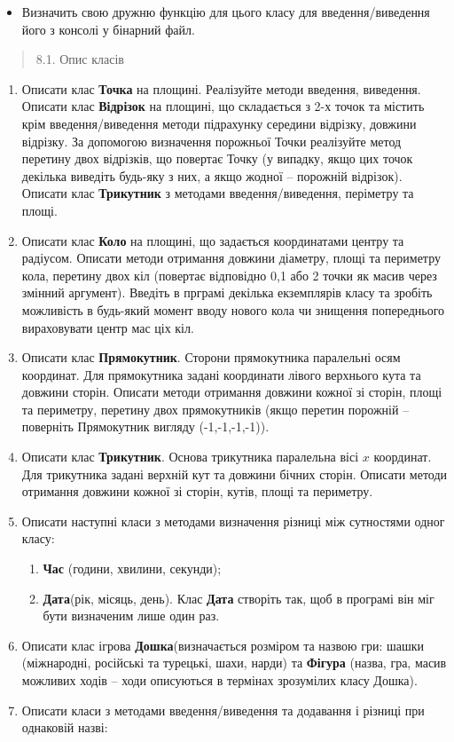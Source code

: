 \documentclass[]{article}
\begin{document}
\begin{itemize}
\item
  Визначить свою дружню функцію для цього класу для введення/виведення
  його з консолі у бінарний файл.
\end{itemize}

\begin{quote}
8.1. Опис класів
\end{quote}

\begin{enumerate}
\def\labelenumi{\arabic{enumi}.}
\item
  \protect\hypertarget{_Hlk65950286}{}{}Описати клас \textbf{Точка} на
  площині. Реалізуйте методи введення, виведення. Описати клас
  \textbf{Відрізок} на площині, що складається з 2-х точок та містить
  крім введення/виведення методи підрахунку середини відрізку, довжини
  відрізку. За допомогою визначення порожньої Точки реалізуйте метод
  перетину двох відрізків, що повертає Точку (у випадку, якщо цих точок
  декілька виведіть будь-яку з них, а якщо жодної -- порожній відрізок).
  Описати клас \textbf{Трикутник} з методами введення/виведення,
  періметру та площі.
\item
  Описати клас \textbf{Коло} на площині, що задається координатами
  центру та радіусом. Описати методи отримання довжини діаметру, площі
  та периметру кола, перетину двох кіл (повертає відповідно 0,1 або 2
  точки як масив через змінний аргумент). Введіть в прграмі декілька
  екземплярів класу та зробіть можливість в будь-який момент вводу
  нового кола чи знищення попереднього вираховувати центр мас ціх кіл.
\item
  Описати клас \textbf{Прямокутник}. Сторони прямокутника паралельні
  осям координат. Для прямокутника задані координати лівого верхнього
  кута та довжини сторін. Описати методи отримання довжини кожної зі
  сторін, площі та периметру, перетину двох прямокутників (якщо перетин
  порожній -- поверніть Прямокутник вигляду (-1,-1,-1,-1)).
\item
  Описати клас \textbf{Трикутник}. Основа трикутника паралельна вісі
  \(x\) координат. Для трикутника задані верхній кут та довжини бічних
  сторін. Описати методи отримання довжини кожної зі сторін, кутів,
  площі та периметру.
\item
  Описати наступні класи з методами визначення різниці між сутностями
  одног класу:

  \begin{enumerate}
  \def\labelenumii{\arabic{enumii}.}
  \item
    \textbf{Час} (години, хвилини, секунди);
  \item
    \textbf{Дата}(рік, місяць, день). Клас \textbf{Дата} створіть так,
    щоб в програмі він міг бути визначеним лише один раз.
  \end{enumerate}
\item
  Описати клас ігрова \textbf{Дошка}(визначається розміром та назвою
  гри: шашки (міжнародні, російські та турецькі, шахи, нарди) та
  \textbf{Фігура} (назва, гра, масив можливих ходів -- ходи описуються в
  термінах зрозумілих класу Дошка).
\item
  Описати класи з методами введення/виведення та додавання і різниці при
  однаковій назві:


\end{enumerate}
\end{document}
